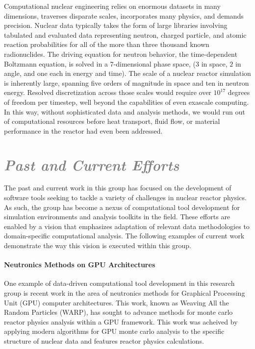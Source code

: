 \documentclass[a4paper, 12pt]{article}
\begin{document}
Computational nuclear engineering relies on enormous datasets in many 
dimensions, traverses disparate scales, incorporates many physics, and demands 
precision.  Nuclear data typically takes the form of large libraries involving 
tabulated and evaluated data representing neutron, charged particle, and atomic 
reaction probabilities for all of the more than three thousand known 
radionuclides.  The driving equation for neutron behavior, the time-dependent 
Boltzmann equation, is solved in a 7-dimensional phase space, ($3$ in space, $2$ 
in angle, and one each in energy and time). The scale of a nuclear reactor 
simulation is inherently large, spanning five orders of magnitude in space and 
ten in neutron energy. Resolved discretization across those scales would require 
over $10^{17}$ degrees of freedom per timestep, well beyond the
capabilities of even exascale computing. In this way, without sophisticated
data and analysis methods, we would run out of computational resources before
heat transport, fluid flow, or material performance in the reactor had even
been addressed. 


\section*{\textcolor{gray}{\it Past and Current Efforts}}

The past and current work in this group has focused 
on the development of software tools seeking to tackle a variety of challenges 
in nuclear reactor physics. As such, the group has become a nexus of 
computational tool development for simulation environments and analysis toolkits 
in the field. These efforts are enabled by a vision that emphasizes adaptation 
of relevant data methodologies to domain-specific computational analysis. The 
following examples of current work demonstrate the way this vision is executed 
within this group.

\paragraph{Neutronics Methods on GPU Architectures}

One example of data-driven computational tool development in this research group 
is recent work in the area of neutronics methods for Graphical Processing Unit 
(GPU) computer architectures. This work, known as Weaving All the Random 
Particles (WARP), has sought to advance methods for monte carlo reactor physics 
analysis within a GPU framework. This work was acheived by applying modern 
algorithms for GPU monte carlo analysis to the specific structure of nuclear 
data and features reactor physics calculations.
\end{document}
